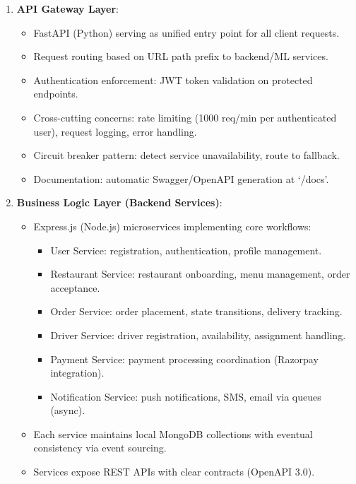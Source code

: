 \documentclass[12pt,a4paper]{report}
\begin{document}
\begin{itemize}
\begin{enumerate}
    \item \textbf{API Gateway Layer}:
    \begin{itemize}
        \item FastAPI (Python) serving as unified entry point for all client requests.
        \item Request routing based on URL path prefix to backend/ML services.
        \item Authentication enforcement: JWT token validation on protected endpoints.
        \item Cross-cutting concerns: rate limiting (1000 req/min per authenticated user), request logging, error handling.
        \item Circuit breaker pattern: detect service unavailability, route to fallback.
        \item Documentation: automatic Swagger/OpenAPI generation at `/docs'.
    \end{itemize}
    
    \item \textbf{Business Logic Layer (Backend Services)}:
    \begin{itemize}
        \item Express.js (Node.js) microservices implementing core workflows:
        \begin{itemize}
            \item User Service: registration, authentication, profile management.
            \item Restaurant Service: restaurant onboarding, menu management, order acceptance.
            \item Order Service: order placement, state transitions, delivery tracking.
            \item Driver Service: driver registration, availability, assignment handling.
            \item Payment Service: payment processing coordination (Razorpay integration).
            \item Notification Service: push notifications, SMS, email via queues (async).
        \end{itemize}
        \item Each service maintains local MongoDB collections with eventual consistency via event sourcing.
        \item Services expose REST APIs with clear contracts (OpenAPI 3.0).
    \end{itemize}
    

\end{enumerate}
\end{itemize}
\end{document}
